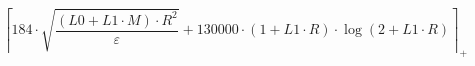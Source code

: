 \[\left\lceil 184 \cdot \sqrt{\frac{\left(L0 + L1 \cdot M\right) \cdot R^{2}}{\varepsilon}} + 130000 \cdot \left(1 + L1 \cdot R\right) \cdot \log\left(2 + L1 \cdot R\right) \right\rceil_{+}\]
